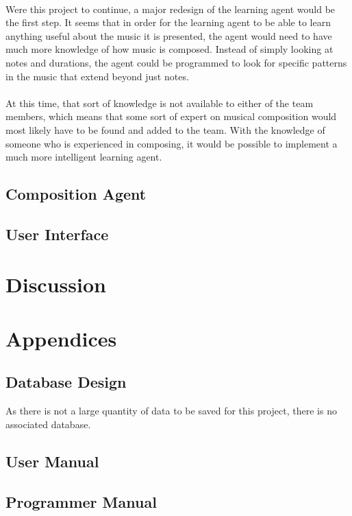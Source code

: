 \documentclass{article}
\begin{document}
\\
Were this project to continue, a major redesign of the learning agent would be the first step. It seems that in order for the learning agent to be able to learn anything useful about the music it is presented, the agent would need to have much more knowledge of how music is composed. Instead of simply looking at notes and durations, the agent could be programmed to look for specific patterns in the music that extend beyond just notes.\\
\\
At this time, that sort of knowledge is not available to either of the team members, which means that some sort of expert on musical composition would most likely have to be found and added to the team. With the knowledge of someone who is experienced in composing, it would be possible to implement a much more intelligent learning agent.

\subsection{Composition Agent}

\subsection{User Interface}


\section{Discussion}

\newpage

\section{Appendices}
\subsection{Database Design}
As there is not a large quantity of data to be saved for this project, there is no associated 
database.

\subsection{User Manual}

\subsection{Programmer Manual}

\newpage





\end{document}
